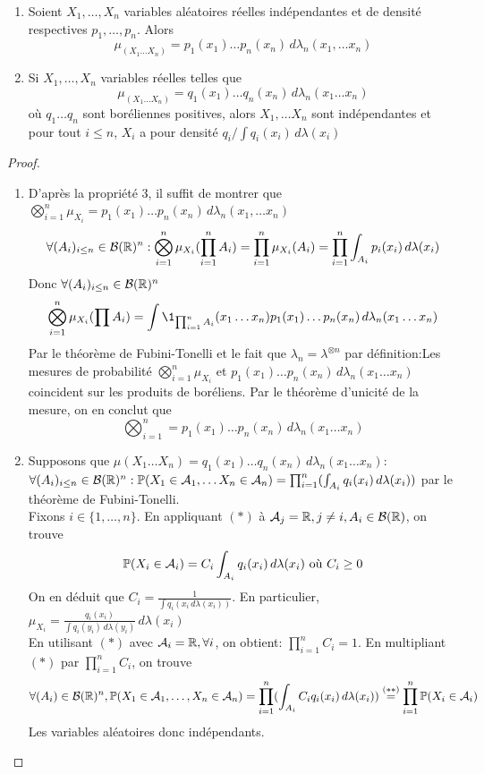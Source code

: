 \documentclass[]{report}
\begin{document}
    \begin{prop}{}{}
        \begin{enumerate}
            \item Soient $X_1,\ldots,X_n$ variables aléatoires réelles indépendantes et de densité respectives $p_1,\ldots,p_n$. Alors
            \[\mu_{(X_1\ldots X_n)}=p_1(x_1)\ldots p_n(x_n)\,d\lambda_n(x_1,\ldots x_n)\]
            \item Si $X_1,\ldots,X_n$ variables réelles telles que
            \[\mu_{(X_1\ldots X_n)}=q_1(x_1)\ldots q_n(x_n)\,d\lambda_n(x_1\ldots x_n)\]
            où $q_1\ldots q_n$ sont boréliennes positives, alors $X_1,\ldots X_n$ sont indépendantes et pour tout $i\le n$, $X_i$ a pour densité $q_i/\int q_i(x_i)\,d\lambda(x_i)$
        \end{enumerate}
    \end{prop}

    \begin{proof}
        \begin{enumerate}
            \item D'après la propriété 3, il suffit de montrer que $\bigotimes_{i=1}^n\mu_{X_i}=p_1(x_1)\ldots p_n(x_n)\,d\lambda_n(x_1,\ldots x_n)$
            \[\forall(A_i)_{i\le n}\in \mathcal{B}(\mathbb{R})^n:\bigotimes_{i=1}^n\mu_{X_i}(\prod_{i=1}^{n}A_i)=\prod_{i=1}^{n}\mu_{X_i}(A_i)=\prod_{i=1}^{n}\int_{A_i}p_i(x_i)\,d\lambda(x_i)\]
            Donc $\forall (A_i)_{i\le n}\in \mathcal{B}(\mathbb{R})^n$
            \[\bigotimes_{i=1}^n \mu_{X_i}(\prod A_i)=\int \1_{\prod_{i=1}^{n}A_i}(x_1\ldots x_n)p_1(x_1)\ldots p_n(x_n)\,d\lambda_n(x_1\ldots x_n)\]
            Par le théorème de Fubini-Tonelli et le fait que $\lambda_n=\lambda^{\otimes n}$ par définition:Les mesures de probabilité $\bigotimes_{i=1}^n\mu_{X_i}$ et $p_1(x_1)\ldots p_n(x_n)\,d\lambda_n(x_1\ldots x_n)$ coincident sur les produits de boréliens. Par le théorème d'unicité de la mesure, on en conclut que
            \[\bigotimes_{i=1}^n=p_1(x_1)\ldots p_n(x_n)\,d\lambda_n(x_1\ldots x_n)\]
            \item Supposons que $\mu(X_1\ldots X_n)=q_1(x_1)\ldots q_n(x_n)\,d\lambda_n(x_1\ldots x_n)$: \\
            $\forall (A_i)_{i\le n}\in \mathcal{B}(\mathbb{R})^n: \mathbb{P}(X_1\in \mathcal{A}_1,\ldots X_n\in \mathcal{A}_n)=\prod_{i=1}^{n}(\int_{A_i} q_i(x_i)\,d\lambda(x_i))$ par le théorème de Fubini-Tonelli.\\
            Fixons $i\in\{1,\ldots,n\}$. En appliquant $(*)$ à $\mathcal{A}_j=\mathbb{R},j\neq i,A_i\in \mathcal{B}(\mathbb{R})$, on trouve
            \[\mathbb{P}(X_i\in\mathcal{A}_i)=C_i\int_{A_i}q_i(x_i)\,d\lambda(x_i)\text{ où }C_i\ge 0\]
            On en déduit que $C_i=\frac{1}{\int q_i(x_i\,d\lambda(x_i))}$. En particulier, $\mu_{X_i}=\frac{q_i(x_i)}{\int q_i(y_i)\,d\lambda(y_i)}\,d\lambda(x_i)$\\
            En utilisant $(*)$ avec $\mathcal{A}_i=\mathbb{R},\forall i$, on obtient: $\prod_{i=1}^{n}C_i=1$. En multipliant $(*)$ par $\prod_{i=1}^{n} C_i$, on trouve
            \[\forall (A_i)\in \mathcal{B}(\mathbb{R})^n, \mathbb{P}(X_1\in \mathcal{A}_1,\ldots, X_n\in \mathcal{A}_n)=\prod_{i=1}^{n}(\int_{A_i}C_i q_i(x_i)\,d\lambda(x_i))\overset{(**)}{=}\prod_{i=1}^{n}\mathbb{P}(X_i\in \mathcal{A}_i)\]
            Les variables aléatoires donc indépendants.
        \end{enumerate}
    \end{proof}
\end{document}
